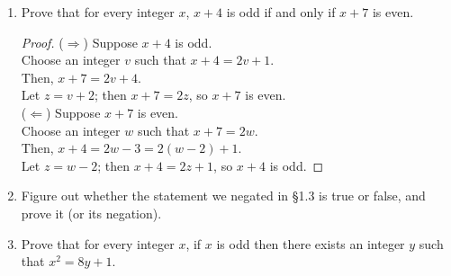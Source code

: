 \documentclass{article}
\begin{document}
\begin{enumerate}
\begin{enumerate}
        
    \end{enumerate}
    \item Prove that for every integer $x$, $x + 4$ is odd if and only if $x + 7$ is even.
    
    \begin{proof}
        ($\Rightarrow$) Suppose $x+4$ is odd. \\
        Choose an integer $v$ such that $x+4=2v+1$. \\
        Then, $x+7 = 2v+4$. \\
        Let $z=v+2$; then $x+7 = 2z$, so $x+7$ is even. \\
        ($\Leftarrow$) Suppose $x+7$ is even. \\
        Choose an integer $w$ such that $x+7=2w$. \\
        Then, $x+4=2w-3=2(w-2)+1$. \\
        Let $z=w-2$; then $x+4=2z+1$, so $x+4$ is odd.
    \end{proof}
    
    \item Figure out whether the statement we negated in \S1.3 is true or false, and prove it (or its negation).
    
    
    \item Prove that for every integer $x$, if $x$ is odd then there exists an integer $y$ such that $x^2 = 8y + 1$.
    
\end{enumerate}
\end{document}
